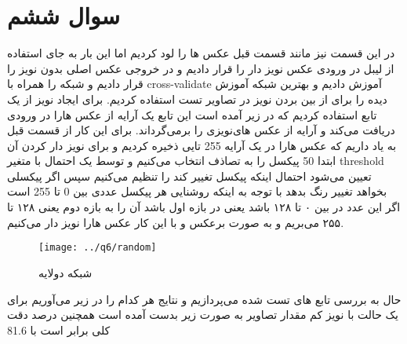 \documentclass[a4paper,12pt]{article}
\begin{document}
\section{سوال ششم}
در این قسمت نیز مانند قسمت قبل عکس ها را لود کردیم اما این بار به جای استفاده از لیبل در ورودی عکس نویز دار را قرار دادیم و در خروجی عکس اصلی بدون نویز را قرار دادیم و شبکه را همراه با cross-validate آموزش دادیم و بهترین شبکه آموزش دیده را برای از بین بردن نویز در تصاویر تست استفاده کردیم. برای ایجاد نویز از یک تابع استفاده کردیم که در زیر آمده است این تابع یک آرایه از عکس هارا در ورودی دریافت می‌کند و آرایه از عکس های‌نویزی را برمی‌گرداند. برای این کار از قسمت قبل به یاد داریم که عکس هارا در یک آرایه 255 تایی ذخیره کردیم و برای نویز دار کردن آن ابتدا 50 پیکسل را به تصاذف انتخاب می‌کنیم و توسط یک احتمال با متغیر threshold تعیین می‌شود احتمال اینکه پیکسل تغییر کند را تنظیم می‌کنیم سپس اگر پیکسلی بخواهد تغییر رنگ بدهد با توجه به اینکه روشنایی هر پیکسل عددی بین 0 تا 255 است اگر این عدد در بین ۰ تا ۱۲۸ باشد یعنی در بازه اول باشد آن را به بازه دوم یعنی ۱۲۸ تا ۲۵۵ می‌بریم و به صورت برعکس و با این کار عکس هارا نویز دار می‌کنیم.
\begin{figure}[!htb]
 \centering
  \texttt{[image: ../q6/random]}
  \caption{ شبکه دولایه }
\end{figure}
\newpage
حال به بررسی تابع های تست شده می‌پردازیم و نتایج هر کدام را در زیر می‌آوریم برای یک حالت با نویز کم مقدار تصاویر به صورت زیر بدست آمده است همچنین درصد دقت کلی برابر است با 81.6
\end{document}
